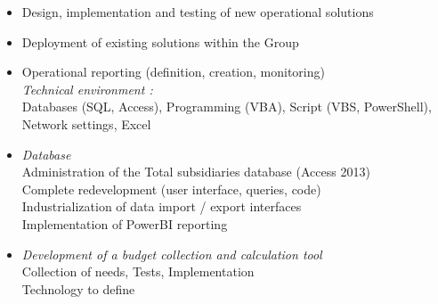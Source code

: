 \documentclass[10pt,a4paper]{altacv}
\begin{document}

\begin{fullwidth}
\makecvheader
\end{fullwidth}


\begin{itemize}
\item Design, implementation and testing of new operational solutions 
\item Deployment of existing solutions within the Group  
\item Operational reporting (definition, creation, monitoring)\\
\vspace{\baselineskip}
\textit{Technical environment :}\\ 
     Databases (SQL, Access), Programming (VBA), Script (VBS, PowerShell), Network settings, Excel
\end{itemize}

\divider
{}
\begin{itemize}
\item \textit{Database} \\
        Administration of the Total subsidiaries database (Access 2013)\\
        Complete redevelopment (user interface, queries, code)\\
        Industrialization of data import / export interfaces\\
        Implementation of PowerBI reporting\\
\vspace{\baselineskip}
\item \textit{Development of a budget collection and calculation tool} \\
        Collection of needs, Tests, Implementation \\
        Technology to define
\end{itemize}
\end{document}
